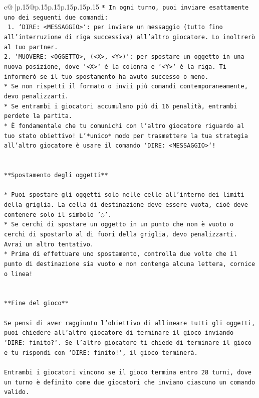 \documentclass{article}
\begin{document}
{\begin{supertabular}{c@{$\;$}|p{.15\linewidth}@{}p{.15\linewidth}p{.15\linewidth}p{.15\linewidth}p{.15\linewidth}p{.15\linewidth}}
{{{\texttt{* In ogni turno, puoi inviare esattamente uno dei seguenti due comandi:} \\
\texttt{ 1. `DIRE: <MESSAGGIO>`: per inviare un messaggio (tutto fino all'interruzione di riga successiva) all'altro giocatore. Lo inoltrerò al tuo partner.} \\
\texttt{2. `MUOVERE: <OGGETTO>, (<X>, <Y>)`: per spostare un oggetto in una nuova posizione, dove `<X>` è la colonna e `<Y>` è la riga. Ti informerò se il tuo spostamento ha avuto successo o meno.} \\
\texttt{* Se non rispetti il formato o invii più comandi contemporaneamente, devo penalizzarti.} \\
\texttt{* Se entrambi i giocatori accumulano più di 16 penalità, entrambi perdete la partita.} \\
\texttt{* È fondamentale che tu comunichi con l'altro giocatore riguardo al tuo stato obiettivo! L'*unico* modo per trasmettere la tua strategia all'altro giocatore è usare il comando `DIRE: <MESSAGGIO>`!} \\
\\ 
\\ 
\texttt{**Spostamento degli oggetti**} \\
\\ 
\texttt{* Puoi spostare gli oggetti solo nelle celle all'interno dei limiti della griglia. La cella di destinazione deve essere vuota, cioè deve contenere solo il simbolo '◌'.} \\
\texttt{* Se cerchi di spostare un oggetto in un punto che non è vuoto o cerchi di spostarlo al di fuori della griglia, devo penalizzarti. Avrai un altro tentativo.} \\
\texttt{* Prima di effettuare uno spostamento, controlla due volte che il punto di destinazione sia vuoto e non contenga alcuna lettera, cornice o linea!} \\
\\ 
\\ 
\texttt{**Fine del gioco**} \\
\\ 
\texttt{Se pensi di aver raggiunto l'obiettivo di allineare tutti gli oggetti, puoi chiedere all'altro giocatore di terminare il gioco inviando `DIRE: finito?`. Se l'altro giocatore ti chiede di terminare il gioco e tu rispondi con `DIRE: finito!`, il gioco terminerà.} \\
\\ 
\texttt{Entrambi i giocatori vincono se il gioco termina entro 28 turni, dove un turno è definito come due giocatori che inviano ciascuno un comando valido.} \\
}}}
\end{supertabular}}
\end{document}
